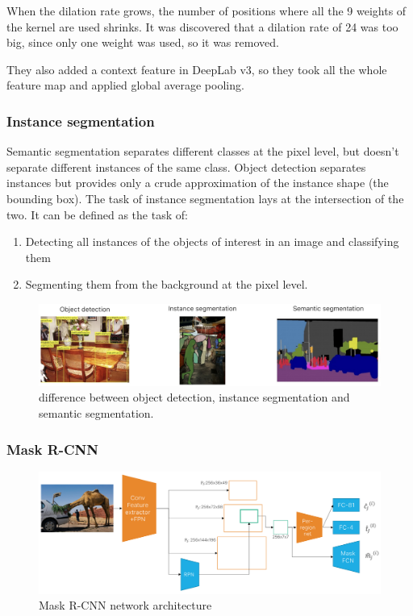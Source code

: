 When the dilation rate grows, the number of positions where all the 9 weights of the kernel are used shrinks.
It was discovered that a dilation rate of 24 was too big, since only one weight was used, so it was removed.

They also added a context feature in DeepLab v3, so they took all the whole feature map and applied global average pooling.

\subsubsection{Instance segmentation}
Semantic segmentation separates different classes at the pixel level, but doesn't separate different instances of the same class.
Object detection separates instances but provides only a crude approximation of the instance shape (the bounding box).
The task of instance segmentation lays at the intersection of the two. It can be defined as the task of:
\begin{enumerate}
  \item Detecting all instances of the objects of interest in an image and classifying them
  \item Segmenting them from the background at the pixel level.
\end{enumerate}

\begin{figure}[htbp]
  \centering
  \includegraphics[width=0.7\linewidth]{./img/instance_segmentation.jpg}
  \caption{difference between object detection, instance segmentation and semantic segmentation.}
\end{figure}

\subsubsection{Mask R-CNN}

\begin{figure}[htbp]
  \centering
  \includegraphics[width=0.7\linewidth]{./img/mask_rcnn.png}
  \caption{Mask R-CNN network architecture}
\end{figure}

